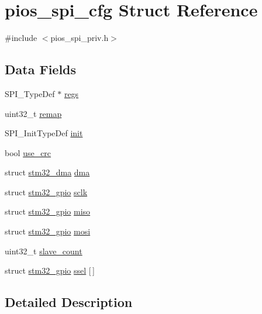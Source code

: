 \hypertarget{structpios__spi__cfg}{\section{pios\-\_\-spi\-\_\-cfg \-Struct \-Reference}
\label{structpios__spi__cfg}
}


{\ttfamily \#include $<$pios\-\_\-spi\-\_\-priv.\-h$>$}

\subsection*{\-Data \-Fields}
\begin{DoxyCompactItemize}
\item 
\-S\-P\-I\-\_\-\-Type\-Def $\ast$ \hyperlink{structpios__spi__cfg_ad167dc65625a3dd4255886c4523b5691}{regs}
\item 
uint32\-\_\-t \hyperlink{structpios__spi__cfg_a1318cbf732716210fffe77ecf7e14649}{remap}
\item 
\-S\-P\-I\-\_\-\-Init\-Type\-Def \hyperlink{structpios__spi__cfg_adbc1199b6671cd7ab6856b5d76038020}{init}
\item 
bool \hyperlink{structpios__spi__cfg_a0ec6229d3970d89ba04dfe718bb68607}{use\-\_\-crc}
\item 
struct \hyperlink{structstm32__dma}{stm32\-\_\-dma} \hyperlink{structpios__spi__cfg_a2facc0b31de6aa6a377366b1d1dfa30f}{dma}
\item 
struct \hyperlink{structstm32__gpio}{stm32\-\_\-gpio} \hyperlink{structpios__spi__cfg_aa190920ba828502df22a5f665027b20d}{sclk}
\item 
struct \hyperlink{structstm32__gpio}{stm32\-\_\-gpio} \hyperlink{structpios__spi__cfg_ac804df72ee895e7482167ac5452b31aa}{miso}
\item 
struct \hyperlink{structstm32__gpio}{stm32\-\_\-gpio} \hyperlink{structpios__spi__cfg_adaf88353246da685e0f82e927d72eaed}{mosi}
\item 
uint32\-\_\-t \hyperlink{structpios__spi__cfg_ad45aed059de6082ab6c257da0018d867}{slave\-\_\-count}
\item 
struct \hyperlink{structstm32__gpio}{stm32\-\_\-gpio} \hyperlink{structpios__spi__cfg_ac1c73f49ee01a82a50dff4f2eb0fbb8e}{ssel} \mbox{[}$\,$\mbox{]}
\end{DoxyCompactItemize}


\subsection{\-Detailed \-Description}


